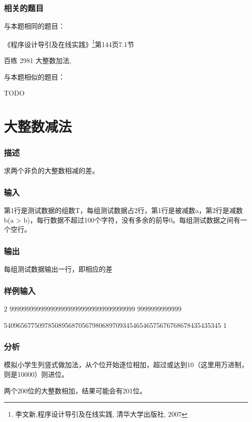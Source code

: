 \subsubsection{相关的题目}
与本题相同的题目：
\begindot
\item 《程序设计导引及在线实践》\footnote{李文新,程序设计导引及在线实践, 清华大学出版社, 2007}第144页7.1节
\item 百练 2981 大整数加法, 
\myenddot

与本题相似的题目：
\begindot
\item  TODO
\myenddot


\section{大整数减法} %
\subsubsection{描述}
求两个非负的大整数相减的差。

\subsubsection{输入}
第1行是测试数据的组数T，每组测试数据占2行，第1行是被减数a，第2行是减数b(a > b)，每行数据不超过100个字符，没有多余的前导0。每组测试数据之间有一个空行。

\subsubsection{输出}
每组测试数据输出一行，即相应的差

\subsubsection{样例输入}
\begin{Code}
2
9999999999999999999999999999999999999
9999999999999

5409656775097850895687056798068970934546546575676768678435435345
1
\end{Code}

\subsubsection{分析}
模拟小学生列竖式做加法，从个位开始逐位相加，超过或达到10（这里用万进制，则是10000）则进位。

两个200位的大整数相加，结果可能会有201位。

